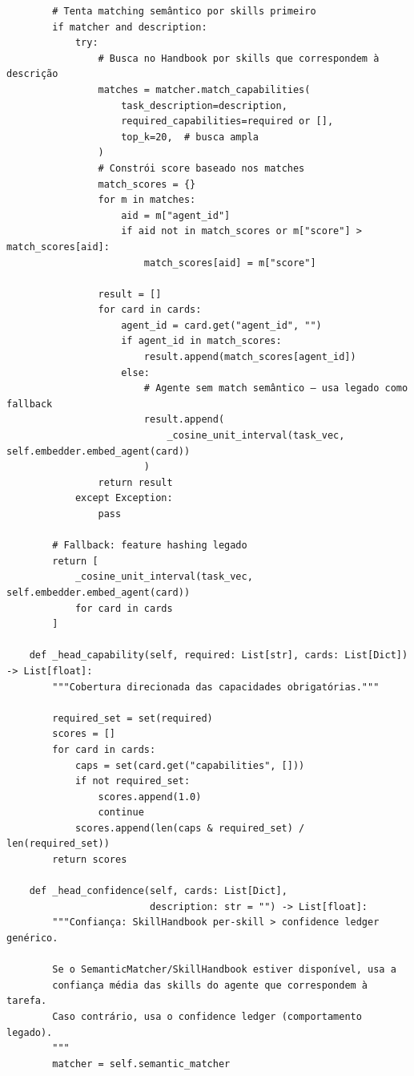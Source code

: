 \documentclass[12pt,openany,oneside,a4paper,brazil,chapter=TITLE]{abntex2}
\begin{document}
\begin{lstlisting}
        # Tenta matching semântico por skills primeiro
        if matcher and description:
            try:
                # Busca no Handbook por skills que correspondem à descrição
                matches = matcher.match_capabilities(
                    task_description=description,
                    required_capabilities=required or [],
                    top_k=20,  # busca ampla
                )
                # Constrói score baseado nos matches
                match_scores = {}
                for m in matches:
                    aid = m["agent_id"]
                    if aid not in match_scores or m["score"] > match_scores[aid]:
                        match_scores[aid] = m["score"]

                result = []
                for card in cards:
                    agent_id = card.get("agent_id", "")
                    if agent_id in match_scores:
                        result.append(match_scores[agent_id])
                    else:
                        # Agente sem match semântico — usa legado como fallback
                        result.append(
                            _cosine_unit_interval(task_vec, self.embedder.embed_agent(card))
                        )
                return result
            except Exception:
                pass

        # Fallback: feature hashing legado
        return [
            _cosine_unit_interval(task_vec, self.embedder.embed_agent(card))
            for card in cards
        ]

    def _head_capability(self, required: List[str], cards: List[Dict]) -> List[float]:
        """Cobertura direcionada das capacidades obrigatórias."""

        required_set = set(required)
        scores = []
        for card in cards:
            caps = set(card.get("capabilities", []))
            if not required_set:
                scores.append(1.0)
                continue
            scores.append(len(caps & required_set) / len(required_set))
        return scores

    def _head_confidence(self, cards: List[Dict],
                         description: str = "") -> List[float]:
        """Confiança: SkillHandbook per-skill > confidence ledger genérico.

        Se o SemanticMatcher/SkillHandbook estiver disponível, usa a
        confiança média das skills do agente que correspondem à tarefa.
        Caso contrário, usa o confidence ledger (comportamento legado).
        """
        matcher = self.semantic_matcher


\end{lstlisting}
\end{document}
